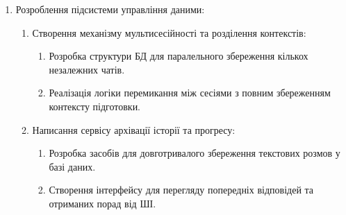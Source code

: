 \documentclass[
]{article}
\begin{document}
\begin{enumerate}
  \begin{enumerate}
  \def\labelenumii{\arabic{enumii}.}
  \item
    Написання сервісу оцінювання відповідей:

    \begin{enumerate}
    \def\labelenumiii{\arabic{enumiii}.}
    \item
      Розробка алгоритмів перевірки технічної точності та логічності
      викладу.
    \item
      Створення системи автоматичного виявлення помилок у відповідях.
    \end{enumerate}
  \item
    Розроблення модуля формування персоналізованих звітів:

    \begin{enumerate}
    \def\labelenumiii{\arabic{enumiii}.}
    \item
      Реалізація сервісу генерації фінальної оцінки за 10-бальною
      шкалою.
    \item
      Створення функціоналу для виведення списку рекомендованих тем для
      доопрацювання.
    \end{enumerate}
  \end{enumerate}
\item
  Розроблення підсистеми управління даними:

  \begin{enumerate}
  \def\labelenumii{\arabic{enumii}.}
  \item
    Створення механізму мультисесійності та розділення контекстів:

    \begin{enumerate}
    \def\labelenumiii{\arabic{enumiii}.}
    \item
      Розробка структури БД для паралельного збереження кількох
      незалежних чатів.
    \item
      Реалізація логіки перемикання між сесіями з повним збереженням
      контексту підготовки.
    \end{enumerate}
  \item
    Написання сервісу архівації історії та прогресу:

    \begin{enumerate}
    \def\labelenumiii{\arabic{enumiii}.}
    \item
      Розробка засобів для довготривалого збереження текстових розмов у
      базі даних.
    \item
      Створення інтерфейсу для перегляду попередніх відповідей та
      отриманих порад від ШІ.
    \end{enumerate}
  \end{enumerate}
\end{enumerate}
\end{document}
